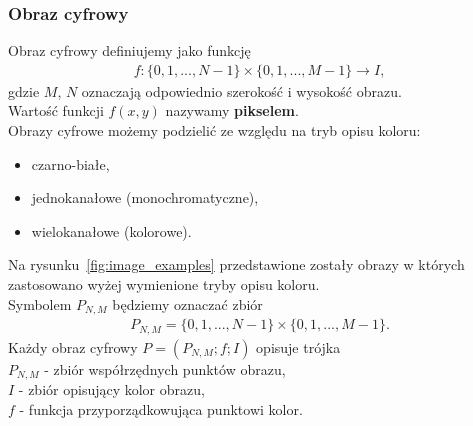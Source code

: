 \subsubsection{Obraz cyfrowy}
Obraz cyfrowy definiujemy jako funkcję
\begin{gather*}
  f: \{0, 1, ..., N-1\} \times \{0, 1, ..., M-1\} \rightarrow I,
\end{gather*}
gdzie $M$, $N$ oznaczają odpowiednio szerokość i wysokość obrazu.\\
Wartość funkcji $f(x, y)$ nazywamy \textbf{pikselem}.\\
Obrazy cyfrowe możemy podzielić ze względu na tryb opisu koloru:
\begin{itemize}
  \item czarno-białe,
  \item jednokanałowe (monochromatyczne),
  \item wielokanałowe (kolorowe).
\end{itemize}
Na rysunku~\ref{fig:image_examples} przedstawione zostały obrazy w których zastosowano wyżej wymienione tryby opisu koloru.\\
Symbolem $P_{N,M}$ będziemy oznaczać zbiór
\begin{gather*}
  P_{N,M} = \{0, 1, ..., N-1\} \times \{0, 1, ..., M-1\}.
\end{gather*}
Każdy obraz cyfrowy $P = (P_{N,M}; f; I)$ opisuje trójka\\
$P_{N,M}$ - zbiór współrzędnych punktów obrazu,\\
$I$ - zbiór opisujący kolor obrazu,\\
$f$ - funkcja przyporządkowująca punktowi kolor.

